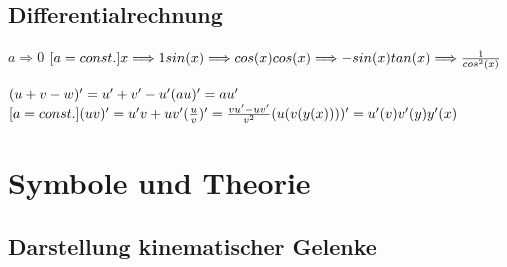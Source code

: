 \begin{minipage}{12.5cm}
	\subsection{Differentialrechnung}
	\begin{minipage}{5cm}
    $ a \Longrightarrow 0$ \space $[a=const.]\\
    x \Longrightarrow 1 \\
    sin(x)\Longrightarrow cos(x) \\
    cos(x)\Longrightarrow -sin(x) \\
    tan(x)\Longrightarrow \frac{1}{cos^{2}(x)} \\
    $
    \end{minipage}
	\begin{minipage}{6cm}
    $ (u+v-w)' = u'+v'-u' \\
    (au)'= au'$ \space $ [a=const.]\\
    (uv)'=u'v + uv' \\
    (\frac{u}{v})' = \frac{vu'-uv'}{v^{2}} \\
    (u(v(y(x))))' = u'(v)v'(y)y'(x) \\
    $
    \end{minipage}
    	
\end{minipage}


\newpage

\section{Symbole und Theorie}
	\subsection{Darstellung kinematischer Gelenke}
		
